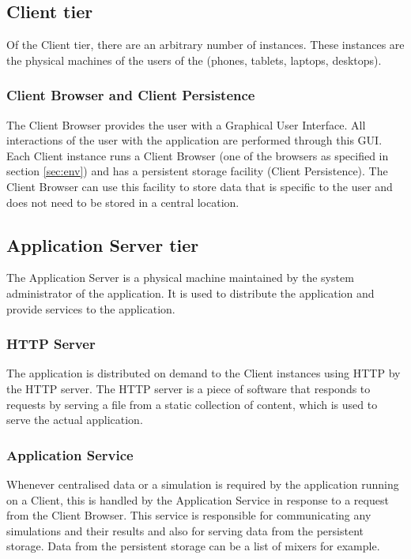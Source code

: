 \subsection{Client tier}
\label{sec:clienttier}
Of the Client tier, there are an arbitrary number of instances. These instances are the physical machines of the users of the \applicationname{} (phones, tablets, laptops, desktops).

\subsubsection{Client Browser and Client Persistence}
\label{sec:clientbrowser}
The Client Browser provides the user with a Graphical User Interface. All interactions of the user with the application are performed through this GUI. Each Client instance runs a Client Browser (one of the browsers as specified in section \ref{sec:env}) and has a persistent storage facility (Client Persistence). The Client Browser can use this facility to store data that is specific to the user and does not need to be stored in a central location.

\subsection{Application Server tier}
\label{sec:aplicationserver}
The Application Server is a physical machine maintained by the system administrator of the application. It is used to distribute the application and provide services to the application.

\subsubsection{HTTP Server}
\label{sec:httpserver}
The application is distributed on demand to the Client instances using HTTP by the HTTP server. The HTTP server is a piece of software that responds to requests by serving a file from a static collection of content, which is used to serve the actual application. 

\subsubsection{Application Service}
\label{sec:applicationservice}
Whenever centralised data or a simulation is required by the application running on a Client, this is handled by the Application Service in response to a request from the Client Browser. This service is responsible for communicating any simulations and their results and also for serving data from the persistent storage. Data from the persistent storage can be a list of mixers for example.

